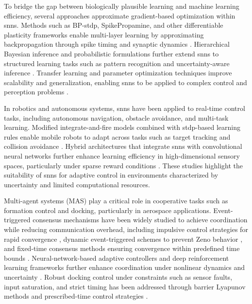 To bridge the gap between biologically plausible learning and machine learning efficiency, several approaches approximate gradient-based optimization within \ac{snn}s. Methods such as BP-\ac{stdp}, SpikePropamine, and other differentiable plasticity frameworks enable multi-layer learning by approximating backpropagation through spike timing and synaptic dynamics \cite{Ch2_R16, Ch2_R25}. Hierarchical Bayesian inference and probabilistic formulations further extend \ac{snn}s to structured learning tasks such as pattern recognition and uncertainty-aware inference \cite{Ch2_R14}. Transfer learning and parameter optimization techniques improve scalability and generalization, enabling \ac{snn}s to be applied to complex control and perception problems \cite{Ch2_R22, Salt2019Parameter, Ch2_R24}.

In robotics and autonomous systems, \ac{snn}s have been applied to real-time control tasks, including autonomous navigation, obstacle avoidance, and multi-task learning. Modified integrate-and-fire models combined with \ac{stdp}-based learning rules enable mobile robots to adapt across tasks such as target tracking and collision avoidance \cite{Ch2_R20}. Hybrid architectures that integrate \ac{snn}s with convolutional neural networks further enhance learning efficiency in high-dimensional sensory spaces, particularly under sparse reward conditions \cite{Ch2_R21}. These studies highlight the suitability of \ac{snn}s for adaptive control in environments characterized by uncertainty and limited computational resources.

Multi-agent systems (MAS) play a critical role in cooperative tasks such as formation control and docking, particularly in aerospace applications. Event-triggered consensus mechanisms have been widely studied to achieve coordination while reducing communication overhead, including impulsive control strategies for rapid convergence \cite{tan2019consensus}, dynamic event-triggered schemes to prevent Zeno behavior \cite{du2020dynamic}, and fixed-time consensus methods ensuring convergence within predefined time bounds \cite{liu2020fixedtime}. Neural-network-based adaptive controllers and deep reinforcement learning frameworks further enhance coordination under nonlinear dynamics and uncertainty \cite{cao2024event, zhang2020eventtriggered, nguyen2020deep}. Robust docking control under constraints such as sensor faults, input saturation, and strict timing has been addressed through barrier Lyapunov methods and prescribed-time control strategies \cite{liu2021event, wang2019prescribed}.


